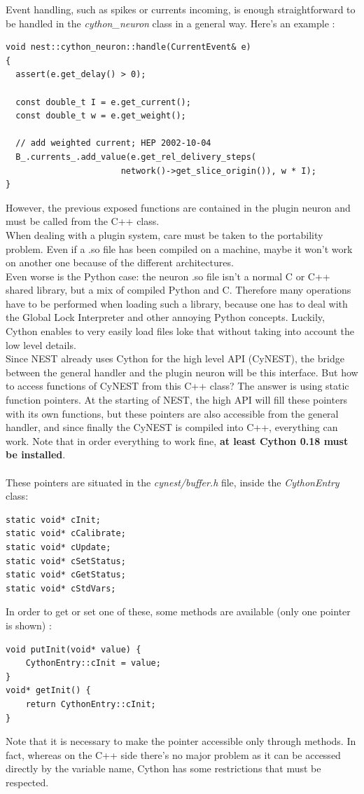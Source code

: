 \documentclass{article}
\begin{document}
Event handling, such as spikes or currents incoming, is enough straightforward to be handled in the \emph{cython\_neuron} class in a general way. Here's an example :
\begin{verbatim}
void nest::cython_neuron::handle(CurrentEvent& e)
{
  assert(e.get_delay() > 0);

  const double_t I = e.get_current();
  const double_t w = e.get_weight();

  // add weighted current; HEP 2002-10-04
  B_.currents_.add_value(e.get_rel_delivery_steps(
                       network()->get_slice_origin()), w * I);
}
\end{verbatim}
However, the previous exposed functions are contained in the plugin neuron and must be called from the C++ class.\\
When dealing with a plugin system, care must be taken to the portability problem. Even if a .so file has been compiled on a machine, maybe it won't work on another one because of the different architectures.\\
Even worse is the Python case: the neuron .so file isn't a normal C or C++ shared library, but a mix of compiled Python and C. Therefore many operations have to be performed when loading such a library, because one has to deal with the Global Lock Interpreter and other annoying Python concepts. Luckily, Cython enables to very easily load files loke that without taking into account the low level details.\\
Since NEST already uses Cython for the high level API (CyNEST), the bridge between the general handler and the plugin neuron will be this interface. But how to access functions of CyNEST from this C++ class? The answer is using static function pointers. At the starting of NEST, the high API  will fill these pointers with its own functions, but these pointers are also accessible from the general handler, and since finally the CyNEST is compiled into C++, everything can work. Note that in order everything to work fine, \textbf{at least Cython 0.18 must be installed}. \\ \\
These pointers are situated in the \emph{cynest/buffer.h} file, inside the \emph{CythonEntry} class:
\begin{verbatim}
static void* cInit;
static void* cCalibrate;
static void* cUpdate;
static void* cSetStatus;
static void* cGetStatus;
static void* cStdVars;
\end{verbatim}
In order to get or set one of these, some methods are available (only one pointer is shown) :
\begin{verbatim}
void putInit(void* value) {
    CythonEntry::cInit = value;
}
void* getInit() {
    return CythonEntry::cInit;
}
\end{verbatim}
Note that it is necessary to make the pointer accessible only through methods. In fact, whereas on the C++ side there's no major problem as it can be accessed directly by the variable name, Cython has some restrictions that must be respected.\\
\end{document}
